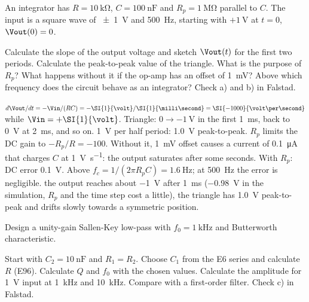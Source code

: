 \label{ex:filt-int}
An integrator has $R = \SI{10}{\kilo\ohm}$, $C = \SI{100}{\nano\farad}$ and $R_p = \SI{1}{\mega\ohm}$ parallel to $C$.
The input is a square wave of \SI{\pm 1}{\volt} and \SI{500}{\hertz}, starting with $+\SI{1}{\volt}$ at $t=0$, $\Vout(0) = 0$.
\begin{talist}
\ta Calculate the slope of the output voltage and sketch $\Vout(t)$ for the first two periods.
\ta Calculate the peak-to-peak value of the triangle.
\ta What is the purpose of $R_p$? What happens without it if the op-amp has an offset of \SI{1}{\milli\volt}?
\ta Above which frequency does the circuit behave as an integrator?
\ta Check a) and b) in Falstad.
\end{talist}

\begin{solution}
\begin{talist}
\ta $d\Vout/dt = -\Vin/(RC) = -\SI{1}{\volt}/\SI{1}{\milli\second} = \SI{-1000}{\volt\per\second}$ while $\Vin = +\SI{1}{\volt}$.
    Triangle: $0 \rightarrow \SI{-1}{\volt}$ in the first \SI{1}{\milli\second}, back to \SI{0}{\volt} at \SI{2}{\milli\second}, and so on.
\ta \SI{1}{\volt} per half period: \SI{1.0}{\volt} peak-to-peak.
\ta $R_p$ limits the DC gain to $-R_p/R = -100$. Without it, \SI{1}{\milli\volt} offset causes a current of \SI{0.1}{\micro\ampere}
    that charges $C$ at \SI{1}{\volt\per\second}: the output saturates after some seconds. With $R_p$: DC error \SI{0.1}{\volt}.
\ta Above $f_c = 1/(2\pi R_p C) = \SI{1.6}{\hertz}$; at \SI{500}{\hertz} the error is negligible.
\ta {}\newline the output reaches about \SI{-1}{\volt} after \SI{1}{\milli\second}
    (\SI{-0.98}{\volt} in the simulation, $R_p$ and the time step cost a little), the triangle has \SI{1.0}{\volt} peak-to-peak and drifts slowly towards a symmetric position.
\end{talist}
\end{solution}

\label{ex:filt-sk}
Design a unity-gain Sallen-Key low-pass with $f_0 = \SI{1}{\kilo\hertz}$ and Butterworth characteristic.
\begin{talist}
\ta Start with $C_2 = \SI{10}{\nano\farad}$ and $R_1 = R_2$. Choose $C_1$ from the E6 series and calculate $R$ (E96).
\ta Calculate $Q$ and $f_0$ with the chosen values.
\ta Calculate the amplitude for \SI{1}{\volt} input at \SI{1}{\kilo\hertz} and \SI{10}{\kilo\hertz}. Compare with a first-order filter.
\ta Check c) in Falstad.
\end{talist}

